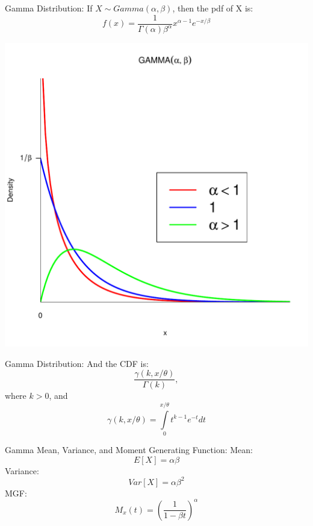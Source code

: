 \documentclass{beamer}
\begin{document}
\begin{frame}{Gamma Distribution:}
  If $X \sim Gamma(\alpha,\beta)$, then the pdf of X is:
  \[
    f(x) = \frac{1}{\Gamma(\alpha)\beta^\alpha}  x ^ {\alpha-1}  e^{-x/\beta} 
  \]
  \begin{center}
  \includegraphics[scale=.3]{plot.pdf}
  \end{center}
\end{frame}
\begin{frame}{Gamma Distribution:}
  And the CDF is:
  \[
    \frac{\gamma(k,x/\theta)}{\Gamma(k)},
  \]
  where $k > 0$, and
  \[ 
    \gamma(k,x/\theta) = \int\limits_0^{x/\theta} {t^{k-1}e^{-t}dt}
  \]
\end{frame}

\begin{frame}{Gamma Mean, Variance, and  Moment Generating Function:}
Mean:
\[
  E[X] = \alpha \beta
\]
Variance:
\[
  Var[X] = \alpha  \beta ^ 2 
\]
MGF:
\[
  M_x(t) = \left( {\frac{1}{1-\beta t}} \right) ^ \alpha
\]

\end{frame}
\end{document}
